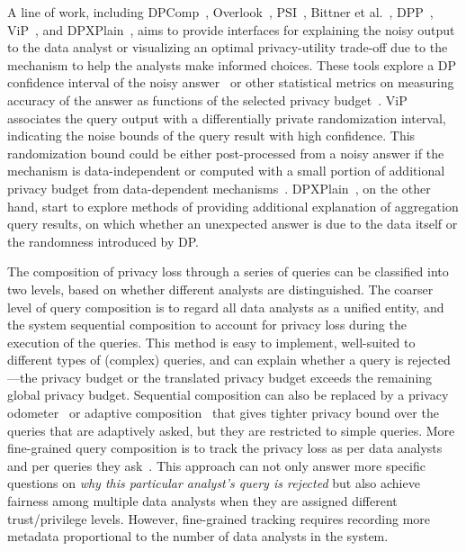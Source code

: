 A line of work, including DPComp~\cite{hay2016exploring}, Overlook~\cite{thaker2020overlook}, PSI~\cite{gaboardi2016psi}, Bittner et al.~\cite{bittner2020understanding}, DPP~\cite{john2021decision}, ViP~\cite{NanayakkaraB0HR22visualizing}, and DPXPlain~\cite{TaoGMR22DPXPlain}, aims to provide interfaces for explaining the noisy output to the data analyst or visualizing an optimal privacy-utility trade-off due to the mechanism to help the analysts make informed choices.
These tools explore a DP confidence interval of the noisy answer~\cite{covington2021unbiased,du2020differentially,cohen2023optimal,drechsler2022nonparametric,NanayakkaraB0HR22visualizing,SunDY23CI} or other statistical metrics on measuring accuracy of the answer as functions of the selected privacy budget~\cite{thaker2020overlook,john2021decision}.
ViP~\cite{NanayakkaraB0HR22visualizing} associates the query output with a differentially private randomization interval, indicating the noise bounds of the query result with high confidence.
This randomization bound could be either post-processed from a noisy answer if the mechanism is data-independent or computed with a small portion of additional privacy budget from data-dependent mechanisms~\cite{covington2021unbiased,du2020differentially,cohen2023optimal,drechsler2022nonparametric}.
DPXPlain~\cite{TaoGMR22DPXPlain}, on the other hand, start to explore methods of providing additional explanation of aggregation query results, on which whether an unexpected answer is due to the data itself or the randomness introduced by DP.
 
The composition of privacy loss through a series of queries can be classified into two levels, based on whether different analysts are distinguished.
The coarser level of query composition is to regard all data analysts as a unified entity, and the system sequential composition to account for privacy loss during the execution of the queries.
This method is easy to implement, well-suited to different types of (complex) queries, and can explain whether a query is rejected—the privacy budget or the translated privacy budget exceeds the remaining global privacy budget.
Sequential composition can also be replaced by a privacy odometer~\cite{RogersVRU16odometer,lecuyer2021odometer} or adaptive composition~\cite{whitehouse2023fully,winograd2017framework,kairouz15} that gives tighter privacy bound over the queries that are adaptively asked, but they are restricted to simple queries.
More fine-grained query composition is to track the privacy loss as per data analysts and per queries they ask~\cite{dprovdb}.
This approach can not only answer more specific questions on \textit{why this particular analyst's query is rejected} but also achieve fairness among multiple data analysts when they are assigned different trust/privilege levels.
However, fine-grained tracking requires recording more metadata proportional to the number of data analysts in the system.


